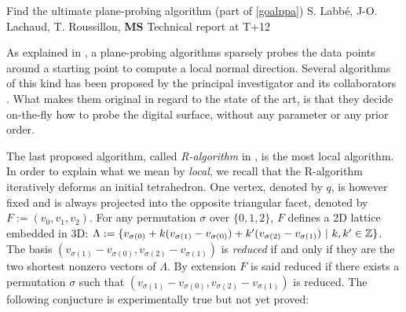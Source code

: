

   {Find the ultimate plane-probing algorithm (part of \ref{goalppa})}
   {S. Labb\'{e}, J-O. Lachaud, T. Roussillon, \textbf{MS}}
   {Technical report at T+12}
\medskip

As explained in , a plane-probing algorithms sparsely probes the data points
around a starting point to compute a local normal direction. Several algorithms of this kind
has been proposed by the principal investigator and its collaborators
\cite{LPRTCS2016, LPRDGCI2016, LPRJMIV2017}.
What makes them original in regard to the state of the art, is that they decide on-the-fly
how to probe the digital surface, without any parameter or any prior order.

The last proposed algorithm, called \emph{R-algorithm} in \cite{LPRJMIV2017}, is the most
local algorithm. In order to explain what we mean by \emph{local}, we recall that
the R-algorithm iteratively deforms an initial tetrahedron. One vertex, denoted by $q$,
is however fixed and is always projected into the opposite triangular facet, denoted by
$F := (v_0,v_1,v_2)$. For any permutation $\sigma$ over $\{0,1,2\}$, $F$ defines a 2D
lattice embedded in 3D:
$\Lambda := \{ v_{\sigma(0)} + k (v_{\sigma(1)}-v_{\sigma(0)}) + k' (v_{\sigma(2)}-v_{\sigma(1)}) \ | \ k,k' \in {\ensuremath\mathbb{Z}} \}$. 
The basis $(v_{\sigma(1)}-v_{\sigma(0)}, v_{\sigma(2)}-v_{\sigma(1)})$ is \emph{reduced} if and only
if they are the two shortest nonzero vectors of $\Lambda$. By extension $F$ is said reduced
if there exists a permutation $\sigma$ such that $(v_{\sigma(1)}-v_{\sigma(0)}, v_{\sigma(2)}-v_{\sigma(1)})$
is reduced. The following conjucture is experimentally true but not yet proved:

